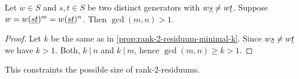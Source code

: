 \begin{coro}
	Let $w \in S$ and $s,t \in S$ be two distinct generators with $w \underline{s} \neq w \underline{t}$. Suppose $w = w(\underline{s} \underline{t})^m = w(\underline{s} \underline{t})^n$. Then $\gcd(m,n) > 1$.

	\begin{proof}
		Let $k$ be the same as in \ref{prop:rank-2-residuum-minimal-k}. Since $w \underline{s} \neq w \underline{t}$ we have $k > 1$. Both, $k \ | \ n$ and $k \ | \ m$, hence $\gcd(m,n) \geq k > 1$.
	\end{proof}
\end{coro}

This constraints the possible size of rank-2-residuums.